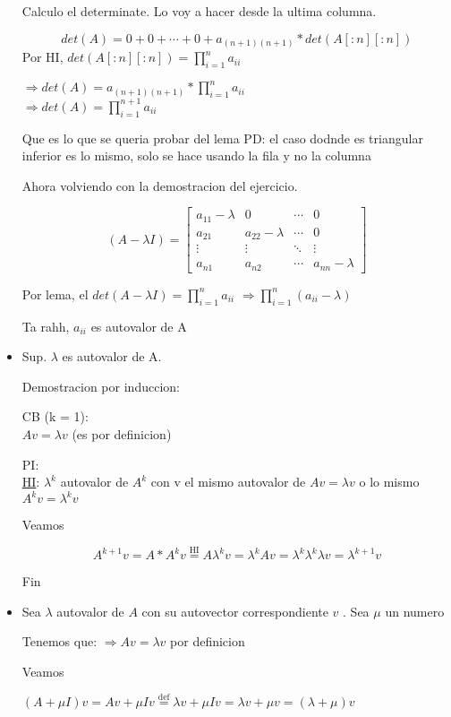 \begin{itemize}
        Calculo el determinate. Lo voy a hacer desde la ultima columna. 

        $$ det(A) = 0 + 0 + \cdots + 0 + a_{(n+1)(n+1)} * det(A[:n][:n]) $$
        Por HI, $det(A[:n][:n]) = \prod_{i=1}^{n} a_{ii}$

        $\Rightarrow det(A) = a_{(n+1)(n+1)} * \prod_{i=1}^{n}a_{ii}$ \\
        $\Rightarrow det(A) = \prod_{i=1}^{n + 1}a_{ii}$

        Que es lo que se queria probar del lema
        PD: el caso dodnde es triangular inferior es lo mismo, solo se hace usando la fila y no la columna

    Ahora volviendo con la demostracion del ejercicio.
   

    \[
        (A - \lambda I) = \begin{bmatrix}
            a_{11} - \lambda & 0 & \cdots & 0 \\
            a_{21} & a_{22} - \lambda & \cdots & 0  \\
            \vdots & \vdots & \ddots & \vdots \\
            a_{n1} & a_{n2} & \cdots & a_{nn} - \lambda
        \end{bmatrix}
            \]

    Por lema, el $det(A - \lambda I) = \prod_{i=1}^{n}a_{ii}$ 
    $\Rightarrow \prod_{i=1}^{n}(a_{ii} - \lambda) $

    Ta rahh, $a_{ii}$ es autovalor de A

    \item Sup. $\lambda$ es autovalor de A.

    Demostracion por induccion:
        
    CB (k = 1): \\  
        $Av = \lambda v$ (es por definicion)

    PI: \\

    \underline{HI}: $\lambda^{k}$ autovalor de $A^{k}$ con v el mismo autovalor de $Av = \lambda v$ o lo mismo $A^{k}v = \lambda^{k}v$

    Veamos

    $$A^{k + 1}v = A * A^{k}v \overset{\text{HI}}{=} A \lambda^{k}v = \lambda^{k} Av = \lambda^{k} \lambda^{k} \lambda v = \lambda^{k + 1} v  $$

    Fin

    \item Sea $\lambda$ autovalor de $A$ con su autovector correspondiente $v$ . Sea $\mu$ un numero

    Tenemos que: $\Rightarrow Av = \lambda v$ por definicion
    
    Veamos
    
    $(A + \mu I)v = Av + \mu I v \overset{\text{def}}{=} \lambda v + \mu Iv = \lambda v + \mu v = (\lambda + \mu) v $


    
\end{itemize}